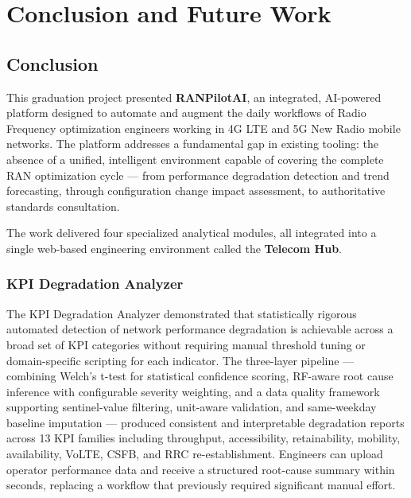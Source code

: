 \chapter{Conclusion and Future Work}
\label{chap:conclusion}

\section{Conclusion}

This graduation project presented \textbf{RANPilotAI}, an integrated, AI-powered platform designed to automate and augment the daily workflows of Radio Frequency optimization engineers working in 4G LTE and 5G New Radio mobile networks. The platform addresses a fundamental gap in existing tooling: the absence of a unified, intelligent environment capable of covering the complete RAN optimization cycle — from performance degradation detection and trend forecasting, through configuration change impact assessment, to authoritative standards consultation.

The work delivered four specialized analytical modules, all integrated into a single web-based engineering environment called the \textbf{Telecom Hub}.

\subsection*{KPI Degradation Analyzer}

The KPI Degradation Analyzer demonstrated that statistically rigorous automated detection of network performance degradation is achievable across a broad set of KPI categories without requiring manual threshold tuning or domain-specific scripting for each indicator. The three-layer pipeline — combining Welch's t-test for statistical confidence scoring, RF-aware root cause inference with configurable severity weighting, and a data quality framework supporting sentinel-value filtering, unit-aware validation, and same-weekday baseline imputation — produced consistent and interpretable degradation reports across 13 KPI families including throughput, accessibility, retainability, mobility, availability, VoLTE, CSFB, and RRC re-establishment. Engineers can upload operator performance data and receive a structured root-cause summary within seconds, replacing a workflow that previously required significant manual effort.

